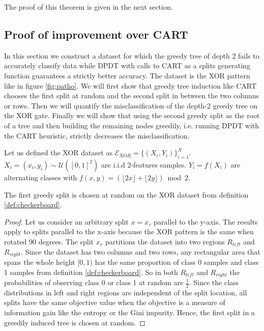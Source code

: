 The proof of this theorem is given in the next section.

\subsection{Proof of improvement over CART}\label{proof-improve-opt}
In this section we construct a dataset for which the greedy tree of depth 2 fails to accurately classify data while DPDT with calls to CART as a splits generating function guarantees a strictly better accuracy. The dataset is the XOR pattern like in figure \ref{fig:patho}. We will first show that greedy tree induction like CART chooses the first split at random and the second split in between the two columns or rows. Then we will quantify the misclassification of the depth-2 greedy tree on the XOR gate. Finally we will show that using the second greedy split as the root of a tree and then building the remaining nodes greedily, i.e. running DPDT with the CART heuristic, strictly decreases the misclassification. 
\begin{definition}\label{def:checkerboard}
     Let us defined the XOR dataset as $\mathcal{E}_{XOR} = \{(X_i, Y_i)\}_{i=1}^N$. $X_i = (x_i, y_i) \sim \mathcal{U}([0,1]^2)$ are i.i.d 2-features samples. $Y_i = f(X_i)$ are alternating classes with $f(x,y) = (\lfloor 2x \rfloor + \lfloor 2y \rfloor) \bmod 2$.
\end{definition}

\begin{lemma} The first greedy split is chosen at random on the XOR dataset from definition \ref{def:checkerboard}.
\end{lemma}\label{lem:first-split}
\begin{proof}
Let us consider an arbitrary split $x = x_v$ parallel to the y-axis. The results apply to splits parallel to the x-axis because the XOR pattern is the same when rotated 90 degrees. The split $x_v$ partitions the dataset into two regions $R_{left}$ and $R_{right}$. Since the dataset has two columns and two rows, any rectangular area that spans the whole height $[0,1)$ has the same proportion of class 0 samples and class 1 samples from definition \ref{def:checkerboard}. So in both $R_{left}$ and $R_{right}$ the probabilities of observing class 0 or class 1 at random are $\frac{1}{2}$. Since the class distributions in left and right regions are independent of the split location, all splits have the same objective value when the objective is a measure of information gain like the entropy or the Gini impurity. Hence, the first split in a greedily induced tree is chosen at random.
\end{proof}

